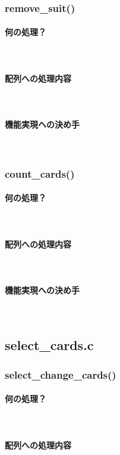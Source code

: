 \documentclass[11pt,a4paper, uplatex]{jsarticle}
\begin{document}
\subsubsection{remove\_suit()}
\paragraph{何の処理？}\mbox{}\\
\paragraph{配列への処理内容}\mbox{}\\
\paragraph{機能実現への決め手}\mbox{}\\
%
\subsubsection{count\_cards()}
\paragraph{何の処理？}\mbox{}\\
\paragraph{配列への処理内容}\mbox{}\\
\paragraph{機能実現への決め手}\mbox{}\\
%
\subsection{select\_cards.c}
%
\subsubsection{select\_change\_cards()}
\paragraph{何の処理？}\mbox{}\\
\paragraph{配列への処理内容}\mbox{}\\
\end{document}
